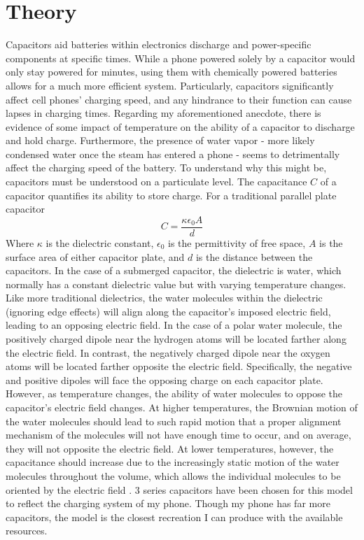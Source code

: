 \documentclass[12pt]{article}
\numberwithin{equation}{section}
\begin{document}
\section{Theory}
\noindent Capacitors aid batteries within electronics discharge and power-specific components at specific times. While a phone powered solely by a capacitor would only stay powered for minutes, using them with chemically powered batteries allows for a much more efficient system. Particularly, capacitors significantly affect cell phones' charging speed, and any hindrance to their function can cause lapses in charging times. Regarding my aforementioned anecdote, there is evidence of some impact of temperature on the ability of a capacitor to discharge and hold charge. Furthermore, the presence of water vapor - more likely condensed water once the steam has entered a phone - seems to detrimentally affect the charging speed of the battery. To understand why this might be, capacitors must be understood on a particulate level. The capacitance $C$ of a capacitor quantifies its ability to store charge. For a traditional parallel plate capacitor 
\begin{equation}
    C = \frac{\kappa \epsilon_0 A}{d}
\end{equation}
Where $\kappa$ is the dielectric constant, $\epsilon_0$ is the permittivity of free space, $A$ is the surface area of either capacitor plate, and $d$ is the distance between the capacitors. In the case of a submerged capacitor, the dielectric is water, which normally has a constant dielectric value but with varying temperature changes. Like more traditional dielectrics, the water molecules within the dielectric (ignoring edge effects) will align along the capacitor's imposed electric field, leading to an opposing electric field. In the case of a polar water molecule, the positively charged dipole near the hydrogen atoms will be located farther along the electric field. In contrast, the negatively charged dipole near the oxygen atoms will be located farther opposite the electric field. Specifically, the negative and positive dipoles will face the opposing charge on each capacitor plate.\\
\noindent However, as temperature changes, the ability of water molecules to oppose the capacitor's electric field changes. At higher temperatures, the Brownian motion of the water molecules should lead to such rapid motion that a proper alignment mechanism of the molecules will not have enough time to occur, and on average, they will not opposite the electric field. At lower temperatures, however, the capacitance should increase due to the increasingly static motion of the water molecules throughout the volume, which allows the individual molecules to be oriented by the electric field . 
3 series capacitors have been chosen for this model to reflect the charging system of my phone. Though my phone has far more capacitors, the model is the closest recreation I can produce with the available resources.
\end{document}
